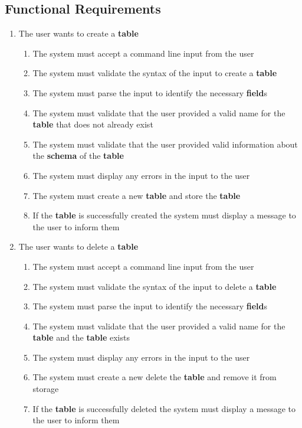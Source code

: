 \documentclass[12pt, titlepage]{article}
\begin{document}
\subsection{Functional Requirements}

\begin{enumerate}[{BE}1.]
    \item The user wants to create a \textbf{table}
    \begin{enumerate}[{FR}1.]
        \item The system must accept a command line input from the user
        \item The system must validate the syntax of the input to create a \textbf{table}
        \item The system must parse the input to identify the necessary \textbf{field}s
        \item The system must validate that the user provided a valid name for the \textbf{table} that does not already exist
        \item The system must validate that the user provided valid information about the \textbf{schema} of the \textbf{table}
        \item The system must display any errors in the input to the user
        \item The system must create a new \textbf{table} and store the \textbf{table}
        \item If the \textbf{table} is successfully created the system must display a message to the user to inform them
    \end{enumerate}
    \item The user wants to delete a \textbf{table}
    \begin{enumerate}[{FR}1.]
        \item The system must accept a command line input from the user
        \item The system must validate the syntax of the input to delete a \textbf{table}
        \item The system must parse the input to identify the necessary \textbf{field}s
        \item The system must validate that the user provided a valid name for the \textbf{table} and the \textbf{table} exists
        \item The system must display any errors in the input to the user
        \item The system must create a new delete the \textbf{table} and remove it from storage
        \item If the \textbf{table} is successfully deleted the system must display a message to the user to inform them

\end{enumerate}
\end{enumerate}
\end{document}
